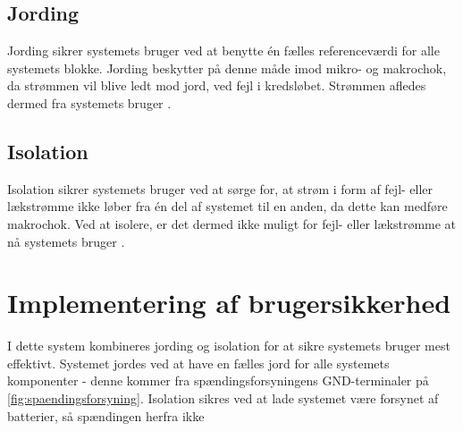 \subsection{Jording}
Jording sikrer systemets bruger ved at benytte én fælles referenceværdi for alle systemets blokke. Jording beskytter på denne måde imod mikro- og makrochok, da strømmen vil blive ledt mod jord, ved fejl i kredsløbet. Strømmen afledes dermed fra systemets bruger \citep{webster1998}.

\subsection{Isolation}
Isolation sikrer systemets bruger ved at sørge for, at strøm i form af fejl- eller lækstrømme ikke løber fra én del af systemet til en anden, da dette kan medføre makrochok. Ved at isolere, er det dermed ikke muligt for fejl- eller lækstrømme at nå systemets bruger \citep{webster1998}. 

\section{Implementering af brugersikkerhed}
I dette system kombineres jording og isolation for at sikre systemets bruger mest effektivt. Systemet jordes ved at have en fælles jord for alle systemets komponenter - denne kommer fra spændingsforsyningens GND-terminaler på \autoref{fig:spaendingsforsyning}. Isolation sikres ved at lade systemet være forsynet af batterier, så spændingen herfra ikke  


